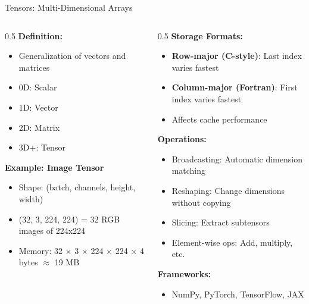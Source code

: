\documentclass[aspectratio=169,xcolor=dvipsnames]{beamer}
\begin{document}
\begin{frame}{Tensors: Multi-Dimensional Arrays}
  \begin{columns}
    \begin{column}{0.5\textwidth}
      \textbf{Definition:}
      \begin{itemize}
        \item Generalization of vectors and matrices
        \item 0D: Scalar
        \item 1D: Vector
        \item 2D: Matrix
        \item 3D+: Tensor
      \end{itemize}

      \vspace{0.3cm}
      \textbf{Example: Image Tensor}
      \begin{itemize}
        \item Shape: (batch, channels, height, width)
        \item (32, 3, 224, 224) = 32 RGB images of 224x224
        \item Memory: 32 $\times$ 3 $\times$ 224 $\times$ 224 $\times$ 4 bytes $\approx$ 19 MB
      \end{itemize}
    \end{column}

    \begin{column}{0.5\textwidth}
      \textbf{Storage Formats:}
      \begin{itemize}
        \item \textbf{Row-major (C-style)}: Last index varies fastest
        \item \textbf{Column-major (Fortran)}: First index varies fastest
        \item Affects cache performance
      \end{itemize}

      \vspace{0.3cm}
      \textbf{Operations:}
      \begin{itemize}
        \item Broadcasting: Automatic dimension matching
        \item Reshaping: Change dimensions without copying
        \item Slicing: Extract subtensors
        \item Element-wise ops: Add, multiply, etc.
      \end{itemize}

      \vspace{0.3cm}
      \textbf{Frameworks:}
      \begin{itemize}
        \item NumPy, PyTorch, TensorFlow, JAX
      \end{itemize}
    \end{column}
  \end{columns}
\end{frame}
\end{document}
